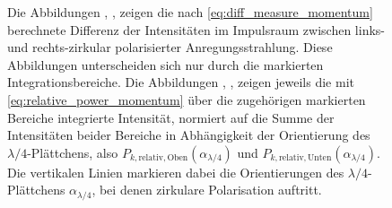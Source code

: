\documentclass[a4paper, titlepage,  ngerman, fullpage]{book}
\begin{document}
\begin{figure}
			\caption[Differenz- und Integrationsdaten PSHE Impulsraum]{Die Abbildungen , ,  zeigen die nach \eqref{eq:diff_measure_momentum} berechnete Differenz der Intensitäten im Impulsraum zwischen links- und rechts-zirkular polarisierter Anregungsstrahlung. Diese Abbildungen unterscheiden sich nur durch die markierten Integrationsbereiche. Die Abbildungen , ,  zeigen jeweils die mit \eqref{eq:relative_power_momentum} über die zugehörigen markierten Bereiche integrierte Intensität, normiert auf die Summe der Intensitäten beider Bereiche in Abhängigkeit der Orientierung des $\lambda/4$-Plättchens, also $P_{k, \mathrm{relativ}, \mathrm{Oben}}(\alpha_{\lambda/4})$ und $P_{k, \mathrm{relativ}, \mathrm{Unten}}(\alpha_{\lambda/4})$. Die vertikalen Linien markieren dabei die Orientierungen des $\lambda/4$-Plättchens $\alpha_{\lambda/4}$, bei denen zirkulare Polarisation auftritt.}	
			\label{fig:spin_hall_measure}	
		\end{figure}
\end{document}
